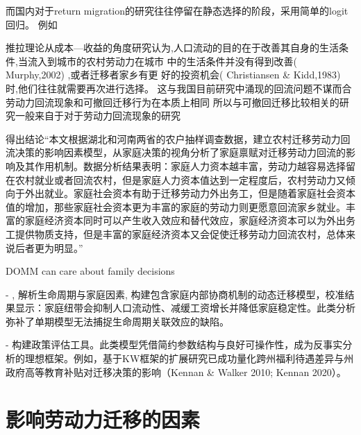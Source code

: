 \documentclass[a4paper,12pt,oneside]{book} %
\begin{document}
而国内对于return migration的研究往往停留在静态选择的阶段，采用简单的logit回归。
例如\cite{RenYuanNongCunWaiChuLaoDongLiHuiLiuQianYiDeYingXiangYinSuHeHuiLiuXiaoYing2017}


推拉理论从成本—收益的角度研究认为,人口流动的目的在于改善其自身的生活条件,当流入到城市的农村劳动力在城市  中的生活条件并没有得到改善( Murphy,2002) ,或者迁移者家乡有更  好的投资机会( Christiansen \& Kidd,1983) 时,他们往往就需要再次进行选择。
这与我国目前研究中涌现的回流问题不谋而合
劳动力回流现象和可撤回迁移行为在本质上相同
所以与可撤回迁移比较相关的研究一般来自于对于劳动力回流现象的研究


\cite{ShiZhiLeiJiaTingBingFuJiaTingJueCeYuNongCunQianYiLaoDongLiHuiLiu2012}得出结论“本文根据湖北和河南两省的农户抽样调查数据，建立农村迁移劳动力回流决策的影响因素模型，从家庭决策的视角分析了家庭禀赋对迁移劳动力回流的影响及其作用机制。数据分析结果表明：家庭人力资本越丰富，劳动力越容易选择留在农村就业或者回流农村，但是家庭人力资本值达到一定程度后，农村劳动力又倾向于外出就业。家庭社会资本有助于迁移劳动力外出务工，但是随着家庭社会资本值的增加，那些家庭社会资本更为丰富的家庭的劳动力则更愿意回流家乡就业。丰富的家庭经济资本同时可以产生收入效应和替代效应，家庭经济资本可以为外出务工提供物质支持，但是丰富的家庭经济资本又会促使迁移劳动力回流农村，总体来说后者更为明显。”






DOMM can care about family decisions

- \cite{gemiciFamilyMigrationLabor2007}, 解析生命周期与家庭因素, 构建包含家庭内部协商机制的动态迁移模型，校准结果显示：家庭纽带会抑制人口流动性、减缓工资增长并降低家庭稳定性。此类分析弥补了单期模型无法捕捉生命周期关联效应的缺陷。







- 构建政策评估工具。此类模型凭借简约参数结构与良好可操作性，成为反事实分析的理想框架。例如，基于KW框架的扩展研究已成功量化跨州福利待遇差异与州政府高等教育补贴对迁移决策的影响（Kennan \& Walker 2010; Kennan 2020）。













\section{影响劳动力迁移的因素}
\end{document}
